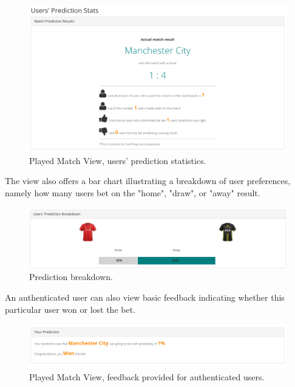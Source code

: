 \begin{figure}[H]
	\begin{center}
		\includegraphics[width=.90\textwidth]{impl/images/predictionStats}
		\caption{Played Match View, users' prediction statistics.} \label{fig:predictionStats}
	\end{center}
\end{figure}

The view also offers a bar chart illustrating a breakdown of user preferences, namely how many users bet on the "home", "draw", or "away" result.

\begin{figure}[H]
	\begin{center}
		\includegraphics[width=.90\textwidth]{impl/images/predictionBreakdown}
		\caption{Prediction breakdown.} \label{fig:predictionBreakdown}
	\end{center}
\end{figure}

An authenticated user can also view basic feedback indicating whether this particular user won or lost the bet.

\begin{figure}[H]
	\begin{center}
		\includegraphics[width=.90\textwidth]{impl/images/feedback}
		\caption{Played Match View, feedback provided for authenticated users.} \label{fig:feedback}
	\end{center}
\end{figure}

